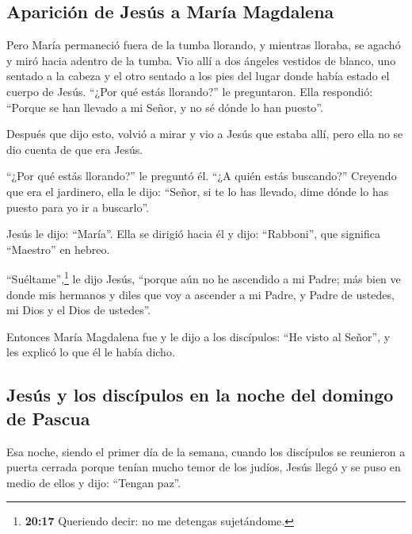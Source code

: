 \hypertarget{apariciuxf3n-de-jesuxfas-a-maruxeda-magdalena}{%
\subsection{Aparición de Jesús a María
Magdalena}\label{apariciuxf3n-de-jesuxfas-a-maruxeda-magdalena}}

 Pero María permaneció fuera de la tumba llorando, y
mientras lloraba, se agachó y miró hacia adentro de la tumba.
 Vio allí a dos ángeles vestidos de blanco, uno sentado a
la cabeza y el otro sentado a los pies del lugar donde había estado el
cuerpo de Jesús.  ``¿Por qué estás llorando?'' le
preguntaron. Ella respondió: ``Porque se han llevado a mi Señor, y no sé
dónde lo han puesto''.

 Después que dijo esto, volvió a mirar y vio a Jesús que
estaba allí, pero ella no se dio cuenta de que era Jesús.

 ``¿Por qué estás llorando?'' le preguntó él. ``¿A quién
estás buscando?'' Creyendo que era el jardinero, ella le dijo: ``Señor,
si te lo has llevado, dime dónde lo has puesto para yo ir a buscarlo''.

 Jesús le dijo: ``María''. Ella se dirigió hacia él y
dijo: ``Rabboni'', que significa ``Maestro'' en hebreo.

 ``Suéltame'',\footnote{\textbf{20:17} Queriendo decir:
  no me detengas sujetándome.} le dijo Jesús, ``porque aún no he
ascendido a mi Padre; más bien ve donde mis hermanos y diles que voy a
ascender a mi Padre, y Padre de ustedes, mi Dios y el Dios de ustedes''.

 Entonces María Magdalena fue y le dijo a los discípulos:
``He visto al Señor'', y les explicó lo que él le había dicho.

\hypertarget{jesuxfas-y-los-discuxedpulos-en-la-noche-del-domingo-de-pascua}{%
\subsection{Jesús y los discípulos en la noche del domingo de
Pascua}\label{jesuxfas-y-los-discuxedpulos-en-la-noche-del-domingo-de-pascua}}

 Esa noche, siendo el primer día de la semana, cuando los
discípulos se reunieron a puerta cerrada porque tenían mucho temor de
los judíos, Jesús llegó y se puso en medio de ellos y dijo: ``Tengan
paz''.

